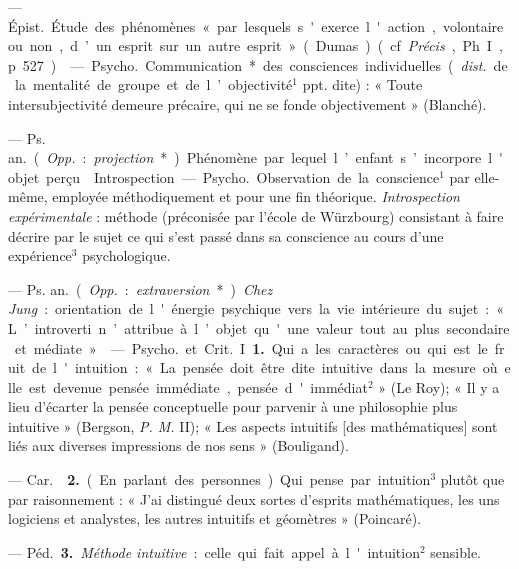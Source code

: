 \begin{itemize}[leftmargin=1cm, label=, itemsep=1pt]
 — \si{Épist.} Étude des phénomènes « par lesquels
s'exerce l'action, volontaire ou non, d’un esprit sur un autre
esprit » (Dumas) (cf. {\it Précis}, Ph. I, p. 527).

 — \si{Psycho.} Communication* des consciences
individuelles ({\it dist.} de la mentalité de groupe et de l’objectivité$^1$
ppt. dite) : « Toute intersubjectivité demeure précaire, qui ne se fonde
objectivement » (Blanché).

 — \si{Ps. an.} ({\it Opp.} : {\it projection}*) Phénomène
par lequel l’enfant s’incorpore l'objet perçu.

\ib{}Introspection. — \si{Psycho.} Observation de la conscience$^1$ par
elle-même, employée méthodiquement et pour une fin théorique.
{\it Introspection expérimentale} : méthode (préconisée par l’école de
Würzbourg) consistant à faire décrire par le sujet ce qui s’est passé dans sa
conscience au cours d'une expérience$^3$ psychologique.

 — \si{Ps. an.} ({\it Opp.} : {\it extraversion}*).
{\it Chez Jung} : orientation de l'énergie psychique vers la vie intérieure
du sujet : « L’introverti n’attribue à l’objet qu'une valeur tout au plus
secondaire et médiate. »

 — \si{Psycho.} et \si{Crit.} I {\bf 1.} Qui a les caractères ou
qui est le fruit de l'intuition : « La pensée doit être dite intuitive dans
la mesure où elle est devenue pensée immédiate, pensée d'immédiat$^2$ » (Le
Roy); « Il y a lieu d’écarter la pensée conceptuelle pour parvenir à une
philosophie plus intuitive » (Bergson, {\it P. M.} II); « Les aspects
intuitifs
[des mathématiques] sont liés aux diverses impressions de nos
sens » (Bouligand).

— \si{Car.}  {\bf 2.} (En parlant des personnes). Qui pense
par intuition$^3$ plutôt que par raisonnement : « J'ai distingué deux sortes
d’esprits mathématiques, les uns logiciens et analystes, les autres intuitifs
et géomètres » (Poincaré).

— \si{Péd.} {\bf 3.} {\it Méthode intuitive} : celle qui fait appel à
l'intuition$^2$ sensible.


\end{itemize}
